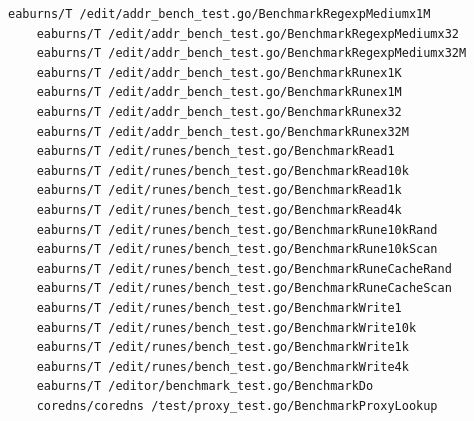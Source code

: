 \documentclass{seal_thesis}
\begin{document}
\begin{lstlisting}[basicstyle=\tiny]
	eaburns/T /edit/addr_bench_test.go/BenchmarkRegexpMediumx1M
	eaburns/T /edit/addr_bench_test.go/BenchmarkRegexpMediumx32
	eaburns/T /edit/addr_bench_test.go/BenchmarkRegexpMediumx32M
	eaburns/T /edit/addr_bench_test.go/BenchmarkRunex1K
	eaburns/T /edit/addr_bench_test.go/BenchmarkRunex1M
	eaburns/T /edit/addr_bench_test.go/BenchmarkRunex32
	eaburns/T /edit/addr_bench_test.go/BenchmarkRunex32M
	eaburns/T /edit/runes/bench_test.go/BenchmarkRead1
	eaburns/T /edit/runes/bench_test.go/BenchmarkRead10k
	eaburns/T /edit/runes/bench_test.go/BenchmarkRead1k
	eaburns/T /edit/runes/bench_test.go/BenchmarkRead4k
	eaburns/T /edit/runes/bench_test.go/BenchmarkRune10kRand
	eaburns/T /edit/runes/bench_test.go/BenchmarkRune10kScan
	eaburns/T /edit/runes/bench_test.go/BenchmarkRuneCacheRand
	eaburns/T /edit/runes/bench_test.go/BenchmarkRuneCacheScan
	eaburns/T /edit/runes/bench_test.go/BenchmarkWrite1
	eaburns/T /edit/runes/bench_test.go/BenchmarkWrite10k
	eaburns/T /edit/runes/bench_test.go/BenchmarkWrite1k
	eaburns/T /edit/runes/bench_test.go/BenchmarkWrite4k
	eaburns/T /editor/benchmark_test.go/BenchmarkDo
	coredns/coredns /test/proxy_test.go/BenchmarkProxyLookup
\end{lstlisting}
\end{document}
